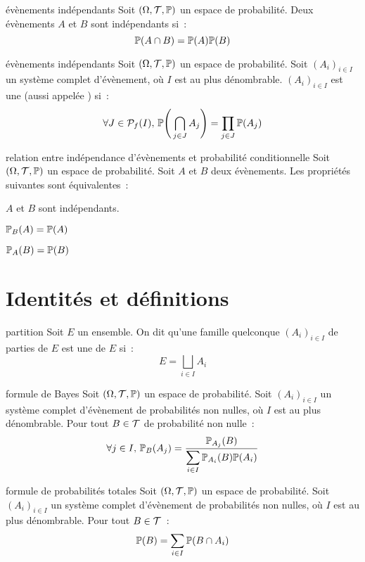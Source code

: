 \begin{definition}{}{évènements indépendants}
    Soit $(\Omega, \mathcal{T}, \mathbb{P})$ un espace de probabilité. Deux évènements $A$ et $B$ sont indépendants si~:
    $$\mathbb{P}(A \cap B) = \mathbb{P}(A) \mathbb{P}(B)$$
\end{definition}

\begin{definition}{15.37}{évènements indépendants}
    Soit $(\Omega, \mathcal{T}, \mathbb{P})$ un espace de probabilité. Soit $(A_i)_{i \in I}$ un système complet d'évènement, où $I$ est au plus dénombrable. $(A_i)_{i \in I}$ est une  (aussi appelée ) si~:
    $$\forall J \in \mathcal{P}_f(I),\, \mathbb{P}\Bigg(\bigcap_{j \in J} A_j\Bigg) = \prod_{j \in J}\mathbb{P}(A_j)$$
\end{definition}

\begin{proposition}{}{relation entre indépendance d'évènements et probabilité conditionnelle}
    Soit $(\Omega, \mathcal{T}, \mathbb{P})$ un espace de probabilité. Soit $A$ et $B$ deux évènements. Les propriétés suivantes sont équivalentes~:
    \begin{enumeratebf}
        \item $A$ et $B$ sont indépendants.
        \item $\mathbb{P}_B(A) = \mathbb{P}(A)$
        \item $\mathbb{P}_A(B) = \mathbb{P}(B)$
    \end{enumeratebf}
    
\end{proposition}

\section{Identités et définitions}

\begin{definition}{}{partition}
    Soit $E$ un ensemble. On dit qu'une famille quelconque $(A_i)_{i\in I}$ de parties de $E$ est une  de $E$ si~:
    $$E = \bigsqcup_{i \in I}A_i$$
\end{definition}

\begin{theoreme}{}{formule de Bayes}
    Soit $(\Omega, \mathcal{T}, \mathbb{P})$ un espace de probabilité. Soit $(A_i)_{i \in I}$ un système complet d'évènement de probabilités non nulles, où $I$ est au plus dénombrable. Pour tout $B \in \mathcal{T}$ de probabilité non nulle~: 
    $$\forall j \in I,\, \mathbb{P}_B(A_j) = \frac{\mathbb{P}_{A_j}(B)}{\displaystyle \sum_{i \in I} \mathbb{P}_{A_i}(B)\mathbb{P}(A_i)}$$
\end{theoreme}

\begin{theoreme}{}{formule de probabilités totales}
    Soit $(\Omega, \mathcal{T}, \mathbb{P})$ un espace de probabilité. Soit $(A_i)_{i \in I}$ un système complet d'évènement de probabilités non nulles, où $I$ est au plus dénombrable. Pour tout $B \in \mathcal{T}$~:
    $$\mathbb{P}(B) = \sum_{i \in I} \mathbb{P}(B \cap A_i)$$
\end{theoreme}



